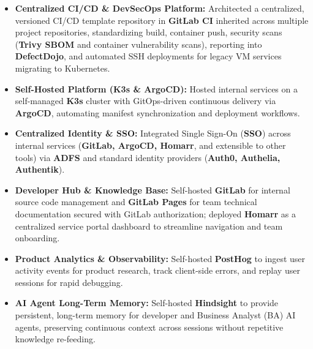 \documentclass[a4paper,10pt]{article}
\begin{document}
\begin{itemize}[leftmargin=*, itemsep=2pt]
    \item \textbf{Centralized CI/CD \& DevSecOps Platform:} Architected a centralized, versioned CI/CD template repository in \textbf{GitLab CI} inherited across multiple project repositories, standardizing build, container push, security scans (\textbf{Trivy SBOM} and container vulnerability scans), reporting into \textbf{DefectDojo}, and automated SSH deployments for legacy VM services migrating to Kubernetes.
    \item \textbf{Self-Hosted Platform (K3s \& ArgoCD):} Hosted internal services on a self-managed \textbf{K3s} cluster with GitOps-driven continuous delivery via \textbf{ArgoCD}, automating manifest synchronization and deployment workflows.
    \item \textbf{Centralized Identity \& SSO:} Integrated Single Sign-On (\textbf{SSO}) across internal services (\textbf{GitLab, ArgoCD, Homarr}, and extensible to other tools) via \textbf{ADFS} and standard identity providers (\textbf{Auth0, Authelia, Authentik}).
    \item \textbf{Developer Hub \& Knowledge Base:} Self-hosted \textbf{GitLab} for internal source code management and \textbf{GitLab Pages} for team technical documentation secured with GitLab authorization; deployed \textbf{Homarr} as a centralized service portal dashboard to streamline navigation and team onboarding.
    \item \textbf{Product Analytics \& Observability:} Self-hosted \textbf{PostHog} to ingest user activity events for product research, track client-side errors, and replay user sessions for rapid debugging.
    \item \textbf{AI Agent Long-Term Memory:} Self-hosted \textbf{Hindsight} to provide persistent, long-term memory for developer and Business Analyst (BA) AI agents, preserving continuous context across sessions without repetitive knowledge re-feeding.
\end{itemize}
\end{document}
